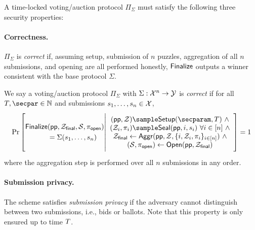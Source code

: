 A time-locked voting/auction protocol $\Pi_\Sigma$ must satisfy the following three security properties:

\paragraph{Correctness.} 
$\Pi_\Sigma$ is \emph{correct} if, assuming setup, submission of $n$ puzzles, aggregation of all $n$ submissions, and opening are all performed honestly, $\sf Finalize$ outputs a winner consistent with the base protocol $\Sigma$.

\begin{definition}[Correctness]\label{def:correctness_cicada}
We say a voting/auction protocol $\Pi_\Sigma$ with $\Sigma: \mathcal{X}^n \to \mathcal{Y}$ is \emph{correct} if for all $\Ttime,\secpar \in \mathbb{N}$ and submissions $s_1, \dots, s_n \in \mathcal{X}$,
\[
    \Pr\left[
        \begin{aligned}
            &\\
            \Finalize &(\pparam, \Z_{\sf final}, \mathcal{S}, \pi_{\sf open}) \\
            &= \Sigma(s_1, \dots, s_n)\\
            &\\
        \end{aligned}
        \middle|
        \begin{array}{c}
            (\pparam, \Z) \sample \Setup(\secparam, \Ttime)~\land\\
            (\Z_i, \pi_i) \sample \Seal(\pparam, i, s_i)~\forall i \in [n]~\land\\
            \Z_{\sf final} \gets \Aggr(\pparam, \Z, \{i, \Z_i, \pi_i\}_{i \in [n]})~\land\\
            (\mathcal{S}, \pi_{\sf open}) \gets \Open(\pparam, \Z_{\sf final}) \\
        \end{array}
    \right] = 1
\]
where the aggregation step is performed over all $n$ submissions in any order.
\end{definition}

\paragraph{Submission privacy.} 
The scheme satisfies \emph{submission privacy} if the adversary cannot distinguish between two submissions, i.e., bids or ballots. Note that this property is only ensured up to time $T$.

